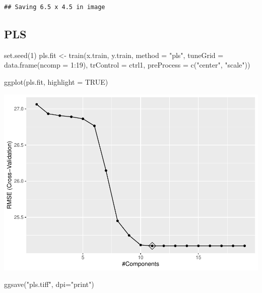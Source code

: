 \documentclass[
]{article}
\newenvironment{Shaded}{\begin{snugshade}}{\end{snugshade}}
\newcommand{\AttributeTok}[1]{\textcolor[rgb]{0.77,0.63,0.00}{#1}}
\newcommand{\ConstantTok}[1]{\textcolor[rgb]{0.00,0.00,0.00}{#1}}
\newcommand{\DecValTok}[1]{\textcolor[rgb]{0.00,0.00,0.81}{#1}}
\newcommand{\FunctionTok}[1]{\textcolor[rgb]{0.00,0.00,0.00}{#1}}
\newcommand{\NormalTok}[1]{#1}
\newcommand{\OtherTok}[1]{\textcolor[rgb]{0.56,0.35,0.01}{#1}}
\newcommand{\SpecialCharTok}[1]{\textcolor[rgb]{0.00,0.00,0.00}{#1}}
\newcommand{\StringTok}[1]{\textcolor[rgb]{0.31,0.60,0.02}{#1}}
\begin{document}
\begin{verbatim}
## Saving 6.5 x 4.5 in image
\end{verbatim}

\hypertarget{pls}{%
\subsection{PLS}\label{pls}}

\begin{Shaded}
\begin{Highlighting}[]
\FunctionTok{set.seed}\NormalTok{(}\DecValTok{1}\NormalTok{)}
\NormalTok{pls.fit }\OtherTok{\textless{}{-}} \FunctionTok{train}\NormalTok{(x.train, y.train,}
                 \AttributeTok{method =} \StringTok{"pls"}\NormalTok{,}
                 \AttributeTok{tuneGrid =} \FunctionTok{data.frame}\NormalTok{(}\AttributeTok{ncomp =} \DecValTok{1}\SpecialCharTok{:}\DecValTok{19}\NormalTok{),}
                 \AttributeTok{trControl =}\NormalTok{ ctrl1,}
                 \AttributeTok{preProcess =} \FunctionTok{c}\NormalTok{(}\StringTok{"center"}\NormalTok{, }\StringTok{"scale"}\NormalTok{))}

\FunctionTok{ggplot}\NormalTok{(pls.fit, }\AttributeTok{highlight =} \ConstantTok{TRUE}\NormalTok{)}
\end{Highlighting}
\end{Shaded}

\includegraphics{DSII_final_js5095_files/figure-latex/unnamed-chunk-8-1.pdf}

\begin{Shaded}
\begin{Highlighting}[]
\FunctionTok{ggsave}\NormalTok{(}\StringTok{"pls.tiff"}\NormalTok{, }\AttributeTok{dpi=}\StringTok{"print"}\NormalTok{)}
\end{Highlighting}
\end{Shaded}
\end{document}
